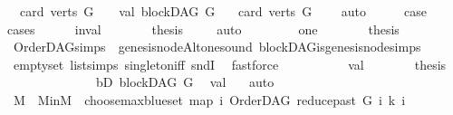 \begin{isabellebody}
\ \ card\ {\isacharparenleft}{\kern0pt}verts\ G{\isacharparenright}{\kern0pt}\ {\isacharequal}{\kern0pt}\ {}{\isachardoublequoteclose}\ {\isacharbar}{\kern0pt}\ {\isacharparenleft}{\kern0pt}val{\isacharparenright}{\kern0pt}\ {\isachardoublequoteopen}blockDAG\ G\ {\isasymand}\isanewline
\ \ card\ {\isacharparenleft}{\kern0pt}verts\ G{\isacharparenright}{\kern0pt}\ {\isasymnoteq}\ {}{\isachardoublequoteclose}\ \isamarkupfalse%
\ auto\isanewline
\ \ \isamarkupfalse%
\ \isamarkupfalse%
\ {\isacharquery}{\kern0pt}case\ \isanewline
\ \ \isamarkupfalse%
{\isacharparenleft}{\kern0pt}cases{\isacharparenright}{\kern0pt}\isanewline
\ \ \ \ \isamarkupfalse%
\ inval\isanewline
\ \ \ \ \isamarkupfalse%
\ \isamarkupfalse%
\ {\isacharquery}{\kern0pt}thesis\ \isamarkupfalse%
\ {}\ \isamarkupfalse%
\ auto\isanewline
\ \ \isamarkupfalse%
\isanewline
\ \ \ \ \isamarkupfalse%
\ one\isanewline
\ \ \ \ \isamarkupfalse%
\ \isamarkupfalse%
\ {\isacharquery}{\kern0pt}thesis\ \isamarkupfalse%
\ OrderDAG{\isachardot}{\kern0pt}simps\ {}\ genesis{\isacharunderscore}{\kern0pt}nodeAlt{\isacharunderscore}{\kern0pt}one{\isacharunderscore}{\kern0pt}sound\ blockDAG{\isachardot}{\kern0pt}is{\isacharunderscore}{\kern0pt}genesis{\isacharunderscore}{\kern0pt}node{\isachardot}{\kern0pt}simps\isanewline
\ \ \ \ \ \ \isamarkupfalse%
\ empty{\isacharunderscore}{\kern0pt}set\ list{\isachardot}{\kern0pt}simps{\isacharparenleft}{\kern0pt}{}{}{\isacharparenright}{\kern0pt}\ singleton{\isacharunderscore}{\kern0pt}iff\ sndI\ \isamarkupfalse%
\ fastforce\ \ \isanewline
\ \ \isamarkupfalse%
\isanewline
\ \ \ \ \isamarkupfalse%
\ val\isanewline
\ \ \ \ \isamarkupfalse%
\ \isamarkupfalse%
\ {\isacharquery}{\kern0pt}thesis\isanewline
\ \ \ \ \isamarkupfalse%
\ \isanewline
\ \ \ \ \ \ \isamarkupfalse%
\ bD{\isacharcolon}{\kern0pt}\ {\isachardoublequoteopen}blockDAG\ G{\isachardoublequoteclose}\ \isamarkupfalse%
\ val\ \ \isamarkupfalse%
\ auto\isanewline
\ \ \ \ \ \ \isamarkupfalse%
\ M\ \ M{\isacharunderscore}{\kern0pt}in{\isacharcolon}{\kern0pt}{\isachardoublequoteopen}M\ {\isacharequal}{\kern0pt}\ choose{\isacharunderscore}{\kern0pt}max{\isacharunderscore}{\kern0pt}blue{\isacharunderscore}{\kern0pt}set\ {\isacharparenleft}{\kern0pt}map\ {\isacharparenleft}{\kern0pt}{\isasymlambda}i{\isachardot}{\kern0pt}\ {\isacharparenleft}{\kern0pt}OrderDAG\ {\isacharparenleft}{\kern0pt}reduce{\isacharunderscore}{\kern0pt}past\ G\ i{\isacharparenright}{\kern0pt}\ k{\isacharcomma}{\kern0pt}\ i{\isacharparenright}{\kern0pt}{\isacharparenright}{\kern0pt}\isanewline

\end{isabellebody}

